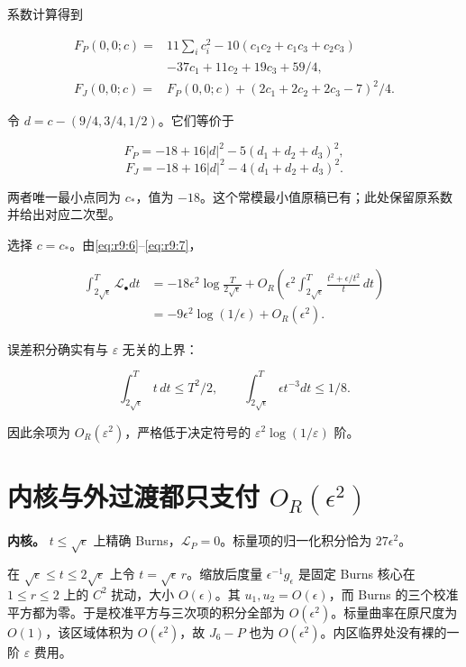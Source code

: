 \documentclass[UTF8,11pt,openany,oneside,fontset=none]{ctexbook}
\begin{document}
系数计算得到

\[
\begin{aligned}
F_P(0,0;c)={}&11\sum_i c_i^2
 -10(c_1c_2+c_1c_3+c_2c_3)\\
&-37c_1+11c_2+19c_3+59/4,\\
F_J(0,0;c)={}&F_P(0,0;c)+(2c_1+2c_2+2c_3-7)^2/4.
\end{aligned}
\]

令 \(d=c-(9/4,3/4,1/2)\)。它们等价于

\[
F_P=-18+16|d|^2-5(d_1+d_2+d_3)^2,
\] \[
F_J=-18+16|d|^2-4(d_1+d_2+d_3)^2.
\]

两者唯一最小点同为 \(c_*\)，值为 \(-18\)。这个常模最小值原稿已有；此处保留原系数并给出对应二次型。

选择 \(c=c_*\)。由\eqref{eq:r9:6}--\eqref{eq:r9:7}，

\[
\begin{aligned}
\int_{2\sqrt\epsilon}^{T}\mathscr L_\bullet dt
&=-18\epsilon^2\log\frac{T}{2\sqrt\epsilon}
 +O_R\left(\epsilon^2\int_{2\sqrt\epsilon}^{T}
 \frac{t^2+\epsilon/t^2}{t}\,dt\right)\\
&=-9\epsilon^2\log(1/\epsilon)+O_R(\epsilon^2).
\end{aligned}
\]

误差积分确实有与 \(\varepsilon\) 无关的上界：

\[
\int_{2\sqrt\epsilon}^{T}t\,dt\le T^2/2,\qquad
\int_{2\sqrt\epsilon}^{T}\epsilon t^{-3}dt\le1/8.
\]

因此余项为 \(O_R(\varepsilon^2)\)，严格低于决定符号的 \(\varepsilon^2\log(1/\varepsilon)\) 阶。

\section{\texorpdfstring{内核与外过渡都只支付 \(O_R(\epsilon^2)\)}{内核与外过渡都只支付 O\_R(\textbackslash epsilon\^{}2)}}\label{ch9:ux5185ux6838ux4e0eux5916ux8fc7ux6e21ux90fdux53eaux652fux4ed8-o_repsilon2}

\textbf{内核。} \(t\le\sqrt\epsilon\) 上精确 Burns，\(\mathscr L_P=0\)。标量项的归一化积分恰为 \(27\epsilon^2\)。

在 \(\sqrt\epsilon\le t\le2\sqrt\epsilon\) 上令 \(t=\sqrt\epsilon\,r\)。缩放后度量 \(\epsilon^{-1}g_\epsilon\) 是固定 Burns 核心在 \(1\le r\le2\) 上的 \(C^2\) 扰动，大小 \(O(\epsilon)\)。其 \(u_1,u_2=O(\epsilon)\)，而 Burns 的三个校准平方都为零。于是校准平方与三次项的积分全部为 \(O(\epsilon^2)\)。标量曲率在原尺度为 \(O(1)\)，该区域体积为 \(O(\epsilon^2)\)，故 \(J_6-P\) 也为 \(O(\epsilon^2)\)。内区临界处没有裸的一阶 \(\varepsilon\) 费用。
\end{document}
